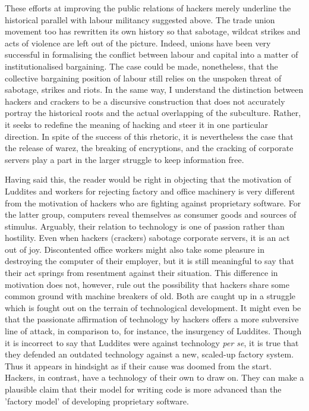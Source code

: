 These ef\hbox{}forts at improving the public relations of hackers merely underline
the historical parallel with labour militancy suggested above. The trade union
movement too has rewritten its own history so that sabotage, wildcat  strikes
and acts of violence are left out of the picture. Indeed, unions have been very
successful in formalising the conf\hbox{}lict between labour and capital into a
matter of institutionalised bargaining. The case could be made, nonetheless,
that the collective bargaining position of labour still relies on the unspoken
threat of sabotage, strikes and riots\cite{gnunited-brown77}. In the same way, I
understand the distinction between hackers and crackers to be a discursive
construction that does not accurately portray the historical roots and the
actual overlapping of the subculture. Rather, it seeks to redef\hbox{}ine the meaning
of hacking and steer it in one particular direction. In spite of the success of
this rhetoric, it is nevertheless the case that the release of warez, the
breaking of encryptions, and the cracking of corporate servers play a part in
the larger struggle to keep information free.

Having said this, the reader would be right in objecting that the motivation of
Luddites and workers for rejecting factory and of\hbox{}f\hbox{}ice machinery is very
dif\hbox{}ferent from the motivation of hackers who are f\hbox{}ighting against
proprietary software. For the latter group, computers reveal themselves as
consumer goods and sources of stimulus. Arguably, their relation to technology
is one of passion rather than hostility. Even when hackers (crackers) sabotage
corporate servers, it is an act out of joy. Discontented of\hbox{}f\hbox{}ice workers
might also take some pleasure in destroying the computer of their employer, but
it is still meaningful to say that their act springs from resentment against
their situation. This dif\hbox{}ference in motivation does not, however, rule out the
possibility that hackers share some common ground with machine breakers of old.
Both are caught up in a struggle which is fought out on the terrain of
technological development. It might even be that the passionate af\hbox{}f\hbox{}irmation
of technology by hackers of\hbox{}fers a more subversive line of attack, in
comparison to, for instance, the insurgency of Luddites. Though it is incorrect
to say that Luddites were against technology \textit{per se}, it is true that
they defended an outdated technology against a new, scaled-up factory system.
Thus it appears in hindsight as if their cause was doomed from the start.
Hackers, in contrast, have a technology of their own to draw on. They can make a
plausible claim that their model for writing code is more advanced than the
'factory model' of developing proprietary software.


